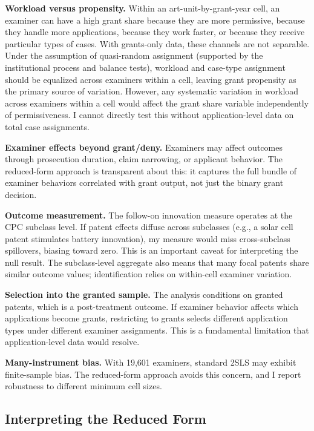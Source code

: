 \documentclass[12pt]{article}
\begin{document}
\textbf{Workload versus propensity.} Within an art-unit-by-grant-year cell, an examiner can have a high grant share because they are more permissive, because they handle more applications, because they work faster, or because they receive particular types of cases. With grants-only data, these channels are not separable. Under the assumption of quasi-random assignment (supported by the institutional process and balance tests), workload and case-type assignment should be equalized across examiners within a cell, leaving grant propensity as the primary source of variation. However, any systematic variation in workload across examiners within a cell would affect the grant share variable independently of permissiveness. I cannot directly test this without application-level data on total case assignments.

\textbf{Examiner effects beyond grant/deny.} Examiners may affect outcomes through prosecution duration, claim narrowing, or applicant behavior. The reduced-form approach is transparent about this: it captures the full bundle of examiner behaviors correlated with grant output, not just the binary grant decision.

\textbf{Outcome measurement.} The follow-on innovation measure operates at the CPC subclass level. If patent effects diffuse across subclasses (e.g., a solar cell patent stimulates battery innovation), my measure would miss cross-subclass spillovers, biasing toward zero. This is an important caveat for interpreting the null result. The subclass-level aggregate also means that many focal patents share similar outcome values; identification relies on within-cell examiner variation.

\textbf{Selection into the granted sample.} The analysis conditions on granted patents, which is a post-treatment outcome. If examiner behavior affects which applications become grants, restricting to grants selects different application types under different examiner assignments. This is a fundamental limitation that application-level data would resolve.

\textbf{Many-instrument bias.} With 19,601 examiners, standard 2SLS may exhibit finite-sample bias. The reduced-form approach avoids this concern, and I report robustness to different minimum cell sizes.

\subsection{Interpreting the Reduced Form}
\end{document}
